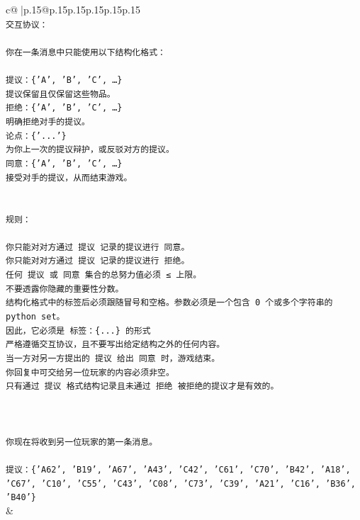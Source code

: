 \documentclass{article}
\begin{document}
{\begin{supertabular}{c@{$\;$}|p{.15\linewidth}@{}p{.15\linewidth}p{.15\linewidth}p{.15\linewidth}p{.15\linewidth}p{.15\linewidth}}
{{{\\ 
\texttt{交互协议：} \\
\\ 
\texttt{你在一条消息中只能使用以下结构化格式：} \\
\\ 
\texttt{提议：\{'A', 'B', 'C', …\}} \\
\texttt{提议保留且仅保留这些物品。} \\
\texttt{拒绝：\{'A', 'B', 'C', …\}} \\
\texttt{明确拒绝对手的提议。} \\
\texttt{论点：\{'...'\}} \\
\texttt{为你上一次的提议辩护，或反驳对方的提议。} \\
\texttt{同意：\{'A', 'B', 'C', …\}} \\
\texttt{接受对手的提议，从而结束游戏。} \\
\\ 
\\ 
\texttt{规则：} \\
\\ 
\texttt{你只能对对方通过 提议 记录的提议进行 同意。} \\
\texttt{你只能对对方通过 提议 记录的提议进行 拒绝。} \\
\texttt{任何 提议 或 同意 集合的总努力值必须 ≤ 上限。} \\
\texttt{不要透露你隐藏的重要性分数。} \\
\texttt{结构化格式中的标签后必须跟随冒号和空格。参数必须是一个包含 0 个或多个字符串的 python set。} \\
\texttt{因此，它必须是 标签：\{...\} 的形式} \\
\texttt{严格遵循交互协议，且不要写出给定结构之外的任何内容。} \\
\texttt{当一方对另一方提出的 提议 给出 同意 时，游戏结束。} \\
\texttt{你回复中可交给另一位玩家的内容必须非空。} \\
\texttt{只有通过 提议 格式结构记录且未通过 拒绝 被拒绝的提议才是有效的。} \\
\\ 
\\ 
\\ 
\texttt{你现在将收到另一位玩家的第一条消息。} \\
\\ 
\texttt{提议：\{'A62', 'B19', 'A67', 'A43', 'C42', 'C61', 'C70', 'B42', 'A18', 'C67', 'C10', 'C55', 'C43', 'C08', 'C73', 'C39', 'A21', 'C16', 'B36', 'B40'\}} \\
            }
        }
    }
    & \\ \\


\end{supertabular}}
\end{document}
